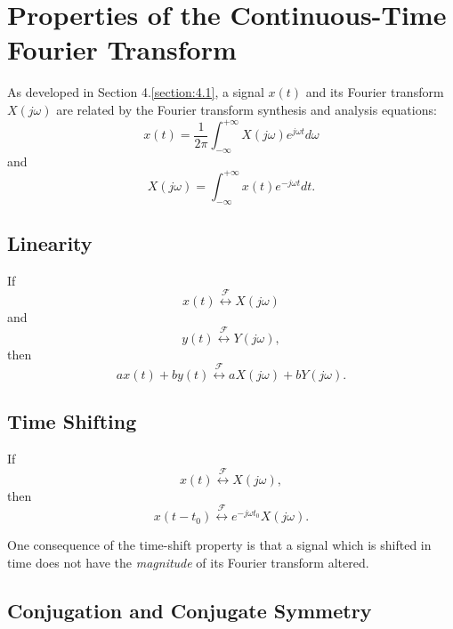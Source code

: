 \documentclass[a4paper,10pt,twoside]{book}
\begin{document}
\section{Properties of the Continuous-Time Fourier Transform}

As developed in Section 4.\ref{section:4.1}, a signal $x(t)$ and its Fourier transform $X(j\omega)$ are related by the Fourier transform synthesis and analysis equations:
\begin{equation}
    x(t)=\frac1{2\pi}\int_{-\infty}^{+\infty}X(j\omega)e^{j\omega t}d\omega
    \label{4.24}
\end{equation}
and
\begin{equation}
    X(j\omega)=\int_{-\infty}^{+\infty}x(t)e^{-j\omega t}dt.
    \label{4.25}
\end{equation}

\subsection{Linearity}

If $$x(t)\overset{\mathcal{F}}{\longleftrightarrow}X(j\omega)$$ and $$y(t)\overset{\mathcal{F}}{\longleftrightarrow}Y(j\omega),$$ then
\begin{equation}
    \boxed{ax(t)+by(t)\overset{\mathcal{F}}{\longleftrightarrow}aX(j\omega)+bY(j\omega).}
    \label{4.26}
\end{equation}

\subsection{Time Shifting}

If $$x(t)\overset{\mathcal{F}}{\longleftrightarrow}X(j\omega),$$ then
\begin{equation}
    \boxed{x(t-t_0)\overset{\mathcal{F}}{\longleftrightarrow}e^{-j\omega t_0}X(j\omega).}
    \label{4.27}
\end{equation}

One consequence of the time-shift property is that a signal which is shifted in time does not have the \textit{magnitude} of its Fourier transform altered.

\subsection{Conjugation and Conjugate Symmetry}
\end{document}
